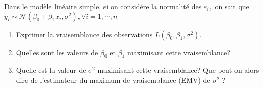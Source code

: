 \documentclass{td_um}
\providecommand{\1}{\mathds{1}}
\begin{document}
\cor{\newpage}


\exo{}
Dans le modèle linéaire simple, si on considère la normalité des $\varepsilon_{i},$ on sait que $y_{i} \sim \mathcal{N}\left(\beta_{0}+\beta_{1} x_{i}, \sigma^{2}\right), \forall i=1, \cdots, n$
\begin{enumerate}
    \item  Exprimer la vraisemblance des observations $L\left(\beta_{0}, \beta_{1}, \sigma^{2}\right)$.
    \item  Quelles sont les valeurs de $\beta_{0}$ et $\beta_{1}$ maximisant cette vraisemblance?
    \item  Quelle est la valeur de $\sigma^{2}$ maximisant cette vraisemblance? Que peut-on alors dire de l'estimateur du maximum de vraisemblance (EMV) de $\sigma^{2}$ ?
\end{enumerate}
\end{document}
